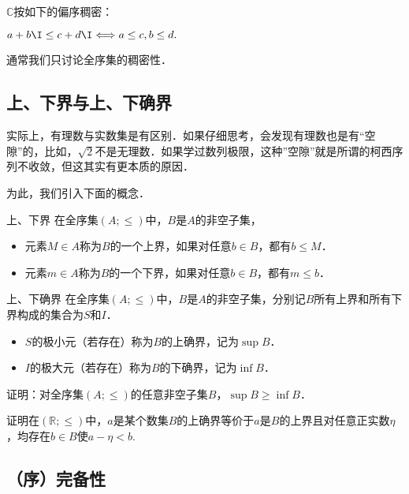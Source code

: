 \begin{example}{}
$\mathbb{C}$按如下的偏序稠密：

$a+b\I\leq c+d\I\Longleftrightarrow a\leq c,b\leq d.$

通常我们只讨论全序集的稠密性．
\end{example}

\subsection{上、下界与上、下确界}

实际上，有理数与实数集是有区别．如果仔细思考，会发现有理数也是有“空隙”的，比如，$\sqrt{2}$不是无理数．如果学过数列极限，这种”空隙”就是所谓的柯西序列不收敛，但这其实有更本质的原因．

为此，我们引入下面的概念．

\begin{definition}{上、下界}
在全序集$(A;\leq)$中，$B$是$A$的非空子集，
\begin{itemize}
\item 元素$M\in A$称为$B$的一个上界，如果对任意$b\in B$，都有$b\leq M$．
\item 元素$m\in A$称为$B$的一个下界，如果对任意$b\in B$，都有$m\leq b$．
\end{itemize}
\end{definition}

\begin{definition}{上、下确界}
在全序集$(A;\leq)$中，$B$是$A$的非空子集，分别记$B$所有上界和所有下界构成的集合为$S$和$I$．
\begin{itemize}
\item $S$的极小元（若存在）称为$B$的上确界，记为$\sup B$．
\item $I$的极大元（若存在）称为$B$的下确界，记为$\inf B$．
\end{itemize}
\end{definition}
\begin{exercise}{}
证明：对全序集$(A;\leq)$的任意非空子集$B$，$\sup B\geq\inf B$．
\end{exercise}
\begin{exercise}{}
证明在$(\mathbb{R};\leq)$中，$a$是某个数集$B$的上确界等价于$a$是$B$的上界且对任意正实数$\eta$，均存在$b\in B$使$a-\eta<b$.
\end{exercise}
\subsection{（序）完备性}

